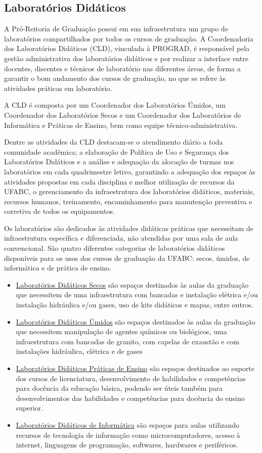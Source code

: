 \subsection{Laboratórios Didáticos}
A Pró-Reitoria de Graduação possui em sua infraestrutura um grupo de laboratórios compartilhados por todos os cursos de graduação. A Coordenadoria dos Laboratórios Didáticos (CLD), vinculada à PROGRAD, é responsável pela gestão administrativa dos laboratórios didáticos e por realizar a interface entre docentes, discentes e técnicos de laboratório nas diferentes áreas, de forma a garantir o bom andamento dos cursos de graduação, no que se refere às atividades práticas em laboratório.

A CLD é composta por um Coordenador dos Laboratórios Úmidos, um Coordenador dos Laboratórios Secos e um Coordenador dos Laboratórios de Informática e Práticas de Ensino, bem como equipe técnico-administrativa. 

Dentre as atividades da CLD destacam-se o atendimento diário a toda comunidade acadêmica; a elaboração de Política de Uso e Segurança dos Laboratórios Didáticos e a análise e adequação da alocação de turmas nos laboratórios em cada quadrimestre letivo, garantindo a adequação dos espaços às atividades propostas em cada disciplina e melhor utilização de recursos da UFABC, o gerenciamento da infraestrutura dos laboratórios didáticos, materiais, recursos humanos, treinamento, encaminhamento para manutenção preventiva e corretiva de todos os equipamentos. 

Os laboratórios são dedicados às atividades didáticas práticas que necessitam de infraestrutura específica e diferenciada, não atendidas por uma sala de aula convencional. São quatro diferentes categorias de laboratórios didáticos disponíveis para os usos dos cursos de graduação da UFABC: secos, úmidos, de informática e de prática de ensino.

\begin{itemize}
	\item \underline{Laboratórios Didáticos Secos} são espaços destinados às aulas da graduação que necessitem de uma infraestrutura com bancadas e instalação elétrica e/ou instalação hidráulica e/ou gases, uso de kits didáticos e mapas, entre outros.
	\item \underline{Laboratórios Didáticos Úmidos} são espaços destinados às aulas da graduação que necessitem manipulação de agentes químicos ou biológicos, uma infraestrutura com bancadas de granito, com capelas de exaustão e com instalações hidráulica, elétrica e de gases
	\item \underline{Laboratórios Didáticos Práticas de Ensino} são espaços destinados ao suporte dos cursos de licenciatura, desenvolvimento de habilidades e competências para docência da educação básica, podendo ser úteis também para desenvolvimentos das habilidades e competências para docência do ensino superior.
	\item \underline{Laboratórios Didáticos de Informática} são espaços para aulas utilizando recursos de tecnologia de informação como microcomputadores, acesso à internet, linguagens de programação, softwares, hardwares e periféricos.
\end{itemize}

